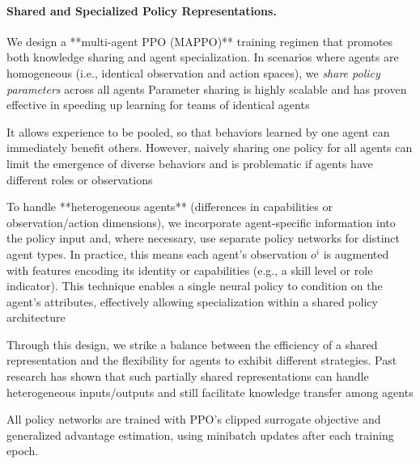 \documentclass{article}
\begin{document}
\paragraph{Shared and Specialized Policy Representations.} 
We design a **multi-agent PPO (MAPPO)** training regimen that promotes 
both knowledge sharing and agent specialization. 
In scenarios where agents are homogeneous (i.e., identical observation and action spaces), 
we \emph{share policy parameters} 
across all agents 
Parameter sharing is highly scalable and has proven effective in speeding up learning for teams of identical agents 

It allows experience to be pooled, so that behaviors learned by one agent can immediately benefit others. However, naively sharing one policy for all agents can limit the emergence of diverse behaviors and is problematic if agents have different roles or observations 

To handle **heterogeneous agents** (differences in capabilities or observation/action dimensions), we incorporate agent-specific information into the policy input and, where necessary, use separate policy networks for distinct agent types. In practice, this means each agent’s observation $o^i$ is augmented with features encoding its identity or capabilities (e.g., a skill level or role indicator). This technique enables a single neural policy to condition on the agent’s attributes, effectively allowing specialization within a shared policy architecture 

Through this design, we strike a balance between the efficiency of a shared representation and the flexibility for agents to exhibit different strategies. Past research has shown that such partially shared representations can handle heterogeneous inputs/outputs and still facilitate knowledge transfer among agents 

All policy networks are trained with PPO's clipped surrogate objective and generalized advantage estimation, using minibatch updates after each training epoch.
\end{document}
